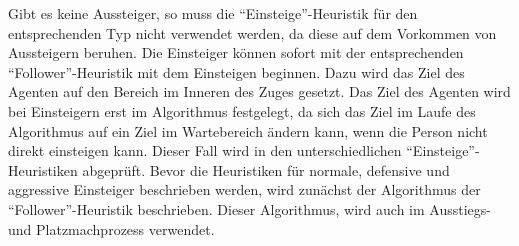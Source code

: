 Gibt es keine Aussteiger, so muss die "`Einsteige"'-Heuristik für den entsprechenden Typ nicht verwendet werden, da diese auf dem Vorkommen von Aussteigern beruhen. Die Einsteiger können sofort mit der entsprechenden "`Follower"'-Heuristik mit dem Einsteigen beginnen. Dazu wird das Ziel des Agenten auf den Bereich im Inneren des Zuges gesetzt. Das Ziel des Agenten wird bei Einsteigern erst im Algorithmus festgelegt, da sich das Ziel im Laufe des Algorithmus auf ein Ziel im Wartebereich ändern kann, wenn die Person nicht direkt einsteigen kann. Dieser Fall wird in den unterschiedlichen "`Einsteige"'-Heuristiken abgeprüft. Bevor die Heuristiken für normale, defensive und aggressive Einsteiger beschrieben werden, wird zunächst der Algorithmus der "`Follower"'-Heuristik beschrieben. Dieser Algorithmus, wird auch im Ausstiegs- und Platzmachprozess verwendet.

